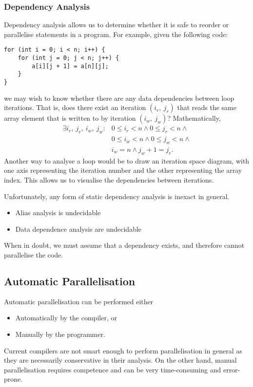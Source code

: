 \documentclass{article}
\begin{document}
\subsubsection{Dependency Analysis}
Dependency analysis allows us to determine whether it is safe to
reorder or parallelise statements in a program. For example, given the
following code:
\begin{verbatim}
for (int i = 0; i < n; i++) {
    for (int j = 0; j < n; j++) {
        a[i][j + 1] = a[n][j];
    }
}
\end{verbatim}
we may wish to know whether there are any data dependencies between
loop iterations. That is, does there exist an iteration \(\left( i_r,\:
j_r \right)\) that reads the same array element that is written to by
iteration \(\left( i_w,\: j_w \right)\)? Mathematically,
\begin{align*}
    \exists i_r,\: j_r,\: i_w,\: j_w : {} & 0 \leqslant i_r < n \land 0 \leqslant j_r < n \land {} \\
                                          & 0 \leqslant i_w < n \land 0 \leqslant j_w < n \land {} \\
                                          & i_w = n \land j_w + 1 = j_r.
\end{align*}
Another way to analyse a loop would be to draw an iteration space
diagram, with one axis representing the iteration number and the other
representing the array index. This allows us to visualise the
dependencies between iterations.

Unfortunately, any form of static dependency analysis is inexact in
general.
\begin{itemize}
    \item Alias analysis is undecidable
    \item Data dependence analysis are undecidable
\end{itemize}
When in doubt, we must assume that a dependency exists, and therefore
cannot parallelise the code.
\subsection{Automatic Parallelisation}
Automatic parallelisation can be performed either
\begin{itemize}
    \item Automatically by the compiler, or
    \item Manually by the programmer.
\end{itemize}
Current compilers are not smart enough to perform parallelisation in
general as they are necessarily conservative in their analysis. On the
other hand, manual parallelisation requires competence and can be very
time-consuming and error-prone.
\end{document}

